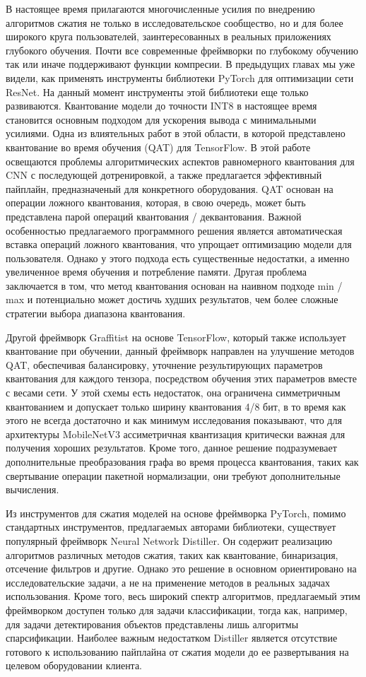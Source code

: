 \documentclass[oneside,final,12pt]{extreport}
\begin{document}
В настоящее время прилагаются многочисленные усилия по внедрению алгоритмов сжатия не только в исследовательское сообщество, но и для более широкого круга пользователей, заинтересованных в реальных приложениях глубокого обучения. Почти все современные фреймворки по глубокому обучению так или иначе поддерживают функции компресии. В предыдущих главах мы уже видели, как применять инструменты библиотеки PyTorch для оптимизации сети ResNet. На данный момент инструменты этой библиотеки еще только развиваются. 
Квантование модели до точности INT8 в настоящее время становится основным подходом для ускорения вывода с минимальными усилиями. Одна из влиятельных работ в этой области, в которой представлено  квантование во время обучения (QAT) для TensorFlow. В этой работе освещаются проблемы алгоритмических аспектов равномерного квантования для CNN с последующей дотренировкой, а также предлагается эффективный пайплайн, предназначеный для конкретного оборудования. QAT основан на операции ложного квантования, которая, в свою очередь, может быть представлена парой операций квантования / деквантования. Важной особенностью предлагаемого программного решения является автоматическая вставка операций ложного квантования, что упрощает оптимизацию модели для пользователя. Однако у этого подхода есть существенные недостатки, а именно увеличенное время обучения и потребление памяти. Другая проблема заключается в том, что метод квантования основан на наивном подходе min / max и потенциально может достичь худших результатов, чем более сложные стратегии выбора диапазона квантования. 

Другой фреймворк Graffitist на основе TensorFlow, который также использует квантование при обучении, данный фреймворк направлен на улучшение методов QAT, обеспечивая балансировку, уточнение результирующих параметров квантования для каждого тензора, посредством обучения этих параметров вместе с весами сети. У этой схемы есть недостаток, она ограничена симметричным квантованием и допускает только ширину квантования 4/8 бит, в то время как этого не всегда достаточно и как минимум исследования показывают, что для архитектуры MobileNetV3 ассиметричная квантизация критически важная для получения хороших результатов. Кроме того, данное решение подразумевает дополнительные преобразования графа во время процесса квантования, таких как свертывание операции пакетной нормализации, они требуют дополнительные вычисления. 

Из инструментов для сжатия моделей на основе фреймворка PyTorch, помимо стандартных инструментов, предлагаемых авторами библиотеки, существует популярный фреймворк Neural Network Distiller. Он содержит реализацию алгоритмов различных методов сжатия, таких как квантование, бинаризация, отсечение фильтров и другие. Однако это решение в основном ориентировано на исследовательские задачи, а не на применение методов в реальных задачах использования. Кроме того, весь широкий спектр алгоритмов, предлагаемый этим фреймворком доступен только для задачи классификации, тогда как, например, для задачи детектирования объектов представлены лишь алгоритмы спарсификации. Наиболее важным недостатком Distiller является отсутствие готового к использованию пайплайна от сжатия модели до ее развертывания на целевом оборудовании клиента.
\end{document}
